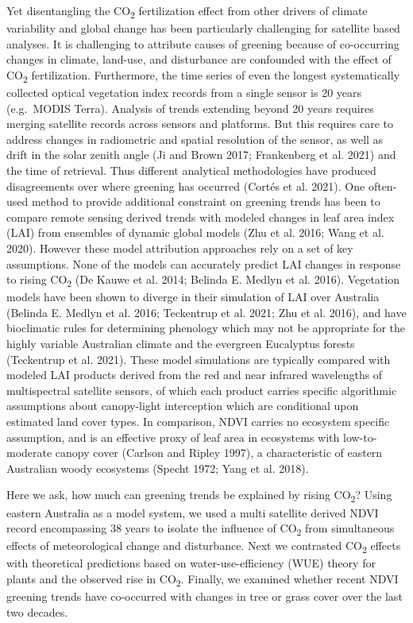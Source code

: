 \documentclass[
]{article}
\begin{document}
Yet disentangling the CO\textsubscript{2} fertilization effect from
other drivers of climate variability and global change has been
particularly challenging for satellite based analyses. It is challenging
to attribute causes of greening because of co-occurring changes in
climate, land-use, and disturbance are confounded with the effect of
CO\textsubscript{2} fertilization. Furthermore, the time series of even
the longest systematically collected optical vegetation index records
from a single sensor is 20 years (e.g.~MODIS Terra). Analysis of trends
extending beyond 20 years requires merging satellite records across
sensors and platforms. But this requires care to address changes in
radiometric and spatial resolution of the sensor, as well as drift in
the solar zenith angle (Ji and Brown 2017; Frankenberg et al. 2021) and
the time of retrieval. Thus different analytical methodologies have
produced disagreements over where greening has occurred (Cortés et al.
2021). One often-used method to provide additional constraint on
greening trends has been to compare remote sensing derived trends with
modeled changes in leaf area index (LAI) from ensembles of dynamic
global models (Zhu et al. 2016; Wang et al. 2020). However these model
attribution approaches rely on a set of key assumptions. None of the
models can accurately predict LAI changes in response to rising
CO\textsubscript{2} (De Kauwe et al. 2014; Belinda E. Medlyn et al.
2016). Vegetation models have been shown to diverge in their simulation
of LAI over Australia (Belinda E. Medlyn et al. 2016; Teckentrup et al.
2021; Zhu et al. 2016), and have bioclimatic rules for determining
phenology which may not be appropriate for the highly variable
Australian climate and the evergreen Eucalyptus forests (Teckentrup et
al. 2021). These model simulations are typically compared with modeled
LAI products derived from the red and near infrared wavelengths of
multispectral satellite sensors, of which each product carries specific
algorithmic assumptions about canopy-light interception which are
conditional upon estimated land cover types. In comparison, NDVI carries
no ecosystem specific assumption, and is an effective proxy of leaf area
in ecosystems with low-to-moderate canopy cover (Carlson and Ripley
1997), a characteristic of eastern Australian woody ecosystems (Specht
1972; Yang et al. 2018).

Here we ask, how much can greening trends be explained by rising
CO\textsubscript{2}? Using eastern Australia as a model system, we used
a multi satellite derived NDVI record encompassing 38 years to isolate
the influence of CO\textsubscript{2} from simultaneous effects of
meteorological change and disturbance. Next we contrasted
CO\textsubscript{2} effects with theoretical predictions based on
water-use-efficiency (WUE) theory for plants and the observed rise in
CO\textsubscript{2}. Finally, we examined whether recent NDVI greening
trends have co-occurred with changes in tree or grass cover over the
last two decades.
\end{document}
